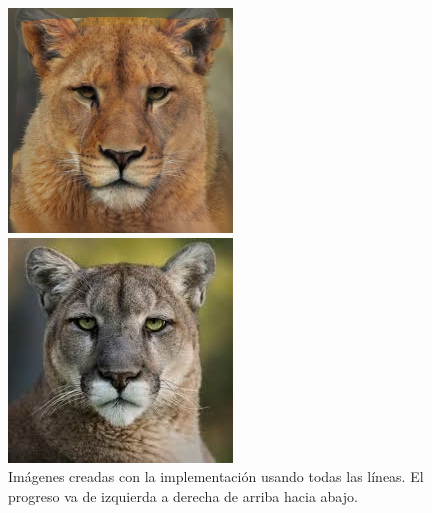 \documentclass[conference]{IEEEtran}
\begin{document}
\begin{figure}[H]
\begin{multicols}{3}
    \includegraphics[width=1.0\linewidth]{TestsCats/XL/img20.png} \par
    \includegraphics[width=1.0\linewidth]{TestsCats/XL/img50.png} \par
\end{multicols}
\caption{Imágenes creadas con la implementación usando todas las líneas. El progreso va de izquierda a derecha de arriba hacia abajo.}
\end{figure}
	
\end{document}
